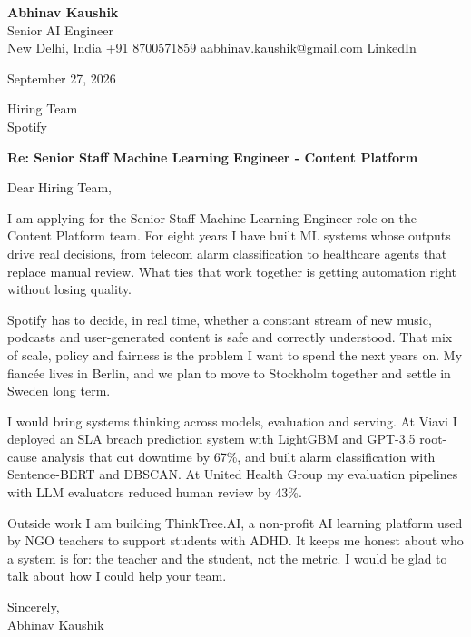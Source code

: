 \documentclass[11pt,a4paper]{article}
\begin{document}
{\Large\bfseries Abhinav Kaushik}\\
Senior AI Engineer\\
New Delhi, India \textbar{} +91 8700571859 \textbar{} \href{mailto:aabhinav.kaushik@gmail.com}{aabhinav.kaushik@gmail.com} \textbar{} \href{https://www.linkedin.com/in/abhinav-kaushik10/}{LinkedIn}  

September 27, 2026

Hiring Team\\
Spotify

\textbf{Re: Senior Staff Machine Learning Engineer - Content Platform}

Dear Hiring Team,

I am applying for the Senior Staff Machine Learning Engineer role on the Content Platform team. For eight years I have built ML systems whose outputs drive real decisions, from telecom alarm classification to healthcare agents that replace manual review. What ties that work together is getting automation right without losing quality.

Spotify has to decide, in real time, whether a constant stream of new music, podcasts and user-generated content is safe and correctly understood. That mix of scale, policy and fairness is the problem I want to spend the next years on. My fiancée lives in Berlin, and we plan to move to Stockholm together and settle in Sweden long term.

I would bring systems thinking across models, evaluation and serving. At Viavi I deployed an SLA breach prediction system with LightGBM and GPT-3.5 root-cause analysis that cut downtime by 67\%, and built alarm classification with Sentence-BERT and DBSCAN. At United Health Group my evaluation pipelines with LLM evaluators reduced human review by 43\%.

Outside work I am building ThinkTree.AI, a non-profit AI learning platform used by NGO teachers to support students with ADHD. It keeps me honest about who a system is for: the teacher and the student, not the metric. I would be glad to talk about how I could help your team.

Sincerely,\\[4pt]
Abhinav Kaushik
\end{document}
